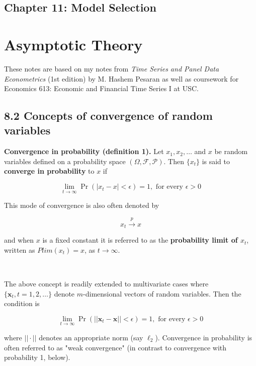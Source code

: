 \documentclass{article}
\begin{document}
\subsection{Chapter 11: Model Selection}

\pagebreak

\section{Asymptotic Theory}

These notes are based on my notes from \textit{Time Series and Panel Data Econometrics} (1st edition) by M. Hashem Pesaran as well as coursework for Economics 613: Economic and Financial Time Series I at USC.


\subsection{8.2 Concepts of convergence of random variables}

\textbf{Convergence in probability (definition 1).} Let \(x_1, x_2, \ldots\) and \(x\) be random variables defined on a probability space \((\Omega, \mathcal{F}, \mathcal{P})\). Then \(\{x_t\}\) is said to \textbf{converge in probability} to \(x\) if

\[
\lim_{t \to \infty} \Pr(|x_t -x| < \epsilon) = 1, \text{ for every } \epsilon > 0
\]

This mode of convergence is also often denoted by

\[
x_t \xrightarrow{p} x
\]

and when \(x\) is a fixed constant it is referred to as the \textbf{probability limit of \(x_t\)}, written as \(Plim(x_t) = x\), as \(t \to \infty\). 

\

The above concept is readily extended to multivariate cases where \(\{ \boldsymbol{x}_t, t = 1, 2, \ldots \}\) denote \(m\)-dimensional vectors of random variables. Then the condition is

\[
\lim_{t \to \infty} \Pr(||\boldsymbol{x}_t -\boldsymbol{x}|| < \epsilon) = 1, \text{ for every } \epsilon > 0
\]

where \(|| \cdot ||\) denotes an appropriate norm (say \(\ell_2\)). Convergence in probability is often referred to as "weak convergence" (in contrast to convergence with probability 1, below).
\end{document}
